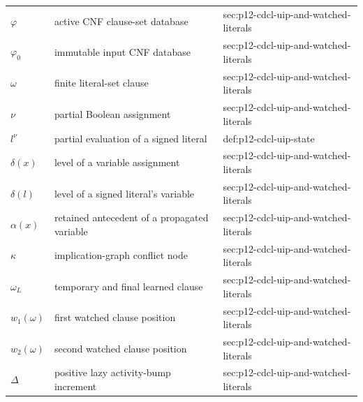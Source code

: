 \begin{longtable}{@{}p{}p{}p{}@{}}
\(\varphi\) & active CNF clause-set database & sec:\allowbreak{}p12-\allowbreak{}cdcl-\allowbreak{}uip-\allowbreak{}and-\allowbreak{}watched-\allowbreak{}literals \\
\(\varphi_0\) & immutable input CNF database & sec:\allowbreak{}p12-\allowbreak{}cdcl-\allowbreak{}uip-\allowbreak{}and-\allowbreak{}watched-\allowbreak{}literals \\
\(\omega\) & finite literal-set clause & sec:\allowbreak{}p12-\allowbreak{}cdcl-\allowbreak{}uip-\allowbreak{}and-\allowbreak{}watched-\allowbreak{}literals \\
\(\nu\) & partial Boolean assignment & sec:\allowbreak{}p12-\allowbreak{}cdcl-\allowbreak{}uip-\allowbreak{}and-\allowbreak{}watched-\allowbreak{}literals \\
\(l^\nu\) & partial evaluation of a signed literal & def:\allowbreak{}p12-\allowbreak{}cdcl-\allowbreak{}uip-\allowbreak{}state \\
\(\delta(x)\) & level of a variable assignment & sec:\allowbreak{}p12-\allowbreak{}cdcl-\allowbreak{}uip-\allowbreak{}and-\allowbreak{}watched-\allowbreak{}literals \\
\(\delta(l)\) & level of a signed literal's variable & sec:\allowbreak{}p12-\allowbreak{}cdcl-\allowbreak{}uip-\allowbreak{}and-\allowbreak{}watched-\allowbreak{}literals \\
\(\alpha(x)\) & retained antecedent of a propagated variable & sec:\allowbreak{}p12-\allowbreak{}cdcl-\allowbreak{}uip-\allowbreak{}and-\allowbreak{}watched-\allowbreak{}literals \\
\(\kappa\) & implication-graph conflict node & sec:\allowbreak{}p12-\allowbreak{}cdcl-\allowbreak{}uip-\allowbreak{}and-\allowbreak{}watched-\allowbreak{}literals \\
\(\omega_L\) & temporary and final learned clause & sec:\allowbreak{}p12-\allowbreak{}cdcl-\allowbreak{}uip-\allowbreak{}and-\allowbreak{}watched-\allowbreak{}literals \\
\(w_1(\omega)\) & first watched clause position & sec:\allowbreak{}p12-\allowbreak{}cdcl-\allowbreak{}uip-\allowbreak{}and-\allowbreak{}watched-\allowbreak{}literals \\
\(w_2(\omega)\) & second watched clause position & sec:\allowbreak{}p12-\allowbreak{}cdcl-\allowbreak{}uip-\allowbreak{}and-\allowbreak{}watched-\allowbreak{}literals \\
\(\Delta\) & positive lazy activity-bump increment & sec:\allowbreak{}p12-\allowbreak{}cdcl-\allowbreak{}uip-\allowbreak{}and-\allowbreak{}watched-\allowbreak{}literals \\

\end{longtable}
